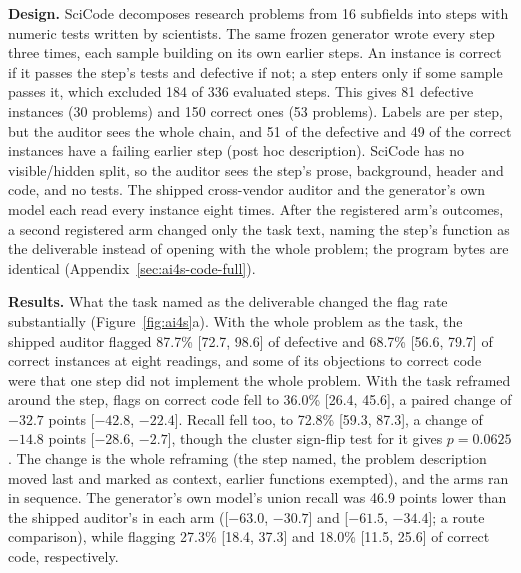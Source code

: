 \textbf{Design.} SciCode \citep{tian2024scicode} decomposes research problems from 16 subfields into
steps with numeric tests written by scientists. The same frozen generator wrote every step three
times, each sample building on its own earlier steps. An instance is correct if it passes the step's
tests and defective if not; a step enters only if some sample passes it, which excluded 184 of 336 evaluated steps. This gives 81 defective instances (30 problems) and 150 correct ones (53 problems). Labels are per step, but the auditor sees the whole chain, and 51 of the defective and 49 of the correct instances have a failing earlier step (post hoc description). SciCode has no visible/hidden split, so
the auditor sees the step's prose, background, header and code, and no tests. The shipped
cross-vendor auditor and the generator's own model each read every instance eight times. After the
registered arm's outcomes, a second registered arm changed only the task text, naming the step's
function as the deliverable instead of opening with the whole problem; the program bytes are
identical (Appendix~\ref{sec:ai4s-code-full}).

\textbf{Results.} What the task named as the deliverable changed the flag rate substantially
(Figure~\ref{fig:ai4s}a). With the whole problem as the task, the shipped auditor
flagged 87.7\% [72.7, 98.6] of defective and 68.7\% [56.6, 79.7] of correct instances at eight
readings, and some of its objections to correct code were that one step did not implement the whole
problem. With the task reframed around the step, flags on correct code fell to 36.0\% [26.4, 45.6],
a paired change of $-32.7$ points [$-42.8$, $-22.4$]. Recall fell too, to 72.8\% [59.3, 87.3], a
change of $-14.8$ points [$-28.6$, $-2.7$], though the cluster sign-flip test for it gives
$p = 0.0625$. The change is the whole reframing (the step named, the problem description moved last
and marked as context, earlier functions exempted), and the arms ran in sequence. The generator's
own model's union recall was 46.9 points lower than the shipped auditor's in each arm ([$-63.0$, $-30.7$] and
[$-61.5$, $-34.4$]; a route comparison), while flagging 27.3\% [18.4, 37.3] and 18.0\% [11.5, 25.6]
of correct code, respectively.

